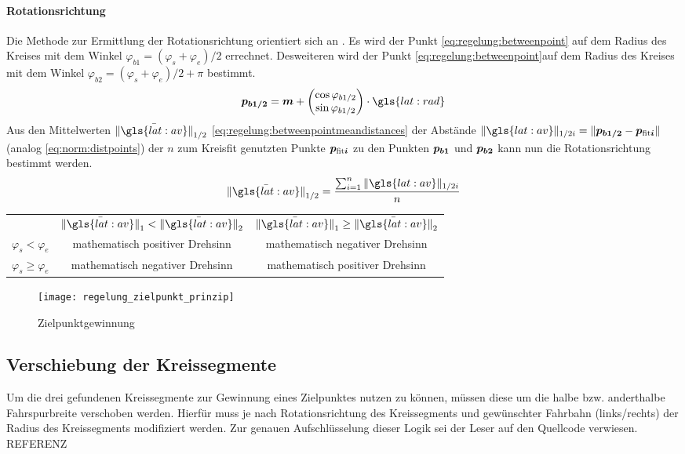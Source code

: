 \paragraph{Rotationsrichtung}
Die Methode zur Ermittlung der Rotationsrichtung orientiert sich an \autocite{drauschkeEchtzeitfaehigeStartpunktalgorithmenFuer2016}. Es wird der Punkt  \eqref{eq:regelung:betweenpoint} auf dem Radius des Kreises mit dem Winkel \(  \varphi_{b1} = (\varphi_s + \varphi_e)/2 \) errechnet.
Desweiteren wird der Punkt  \eqref{eq:regelung:betweenpoint}auf dem Radius des Kreises mit dem Winkel \(  \varphi_{b2} = (\varphi_s + \varphi_e)/2 + \pi \) bestimmt.
\begin{equation} \label{eq:regelung:betweenpoint}
\pnt{p_{b1/2}} = \pnt{m} + 
\begin{pmatrix}
\cos{\varphi_{b1/2}} \\
\sin{\varphi_{b1/2}}
\end{pmatrix}
\cdot \gls{lat:rad}
\end{equation}
Aus den Mittelwerten \( \mean{\nrm{\gls{lat:av}}}_{1/2} \) \eqref{eq:regelung:betweenpointmeandistances} der Abstände \( \nrm{\gls{lat:av}}_{1/2i} = \nrm{\pnt{p_{b1/2}} - \pnt{p_{\text{fit}i}}} \) (analog \ref{eq:norm:distpoints}) der \(n\) zum Kreisfit genutzten Punkte \(\boldsymbol{p_{\text{fit}i}}\) zu den Punkten \(\boldsymbol{p_{b1}}\) und \(\boldsymbol{p_{b2}}\) kann nun die Rotationsrichtung bestimmt werden.
\begin{equation} \label{eq:regelung:betweenpointmeandistances}
\mean{\nrm{\gls{lat:av}}}_{1/2} = \frac{\sum_{i=1}^n \nrm{\gls{lat:av}}_{1/2i}}{n} 
\end{equation}
\begin{tabular}{ccc}
& \(\mean{\nrm{\gls{lat:av}}}_{1}<\mean{\nrm{\gls{lat:av}}}_{2}\) & 
\(\mean{\nrm{\gls{lat:av}}}_{1}\geq \mean{\nrm{\gls{lat:av}}}_{2}\) \\
\(\varphi_s<\varphi_e\) &  mathematisch positiver Drehsinn & mathematisch negativer Drehsinn \\
\(\varphi_s\geq \varphi_e\) &  mathematisch negativer Drehsinn & mathematisch positiver Drehsinn
\end{tabular}

\begin{figure}[htb]
  \centering
  \texttt{[image: regelung\_zielpunkt\_prinzip]}
  \caption{Zielpunktgewinnung}
  \label{fig:regelung:zielpunkt:zielpunktgewinnung}
\end{figure}

\subsection{Verschiebung der Kreissegmente}
Um die drei gefundenen Kreissegmente zur Gewinnung eines Zielpunktes nutzen zu können, müssen diese um die halbe bzw. anderthalbe Fahrspurbreite verschoben werden. Hierfür muss je nach Rotationsrichtung des Kreissegments und gewünschter Fahrbahn (links/rechts) der Radius des Kreissegments modifiziert werden. Zur genauen Aufschlüsselung dieser Logik sei der Leser auf den Quellcode verwiesen. REFERENZ

